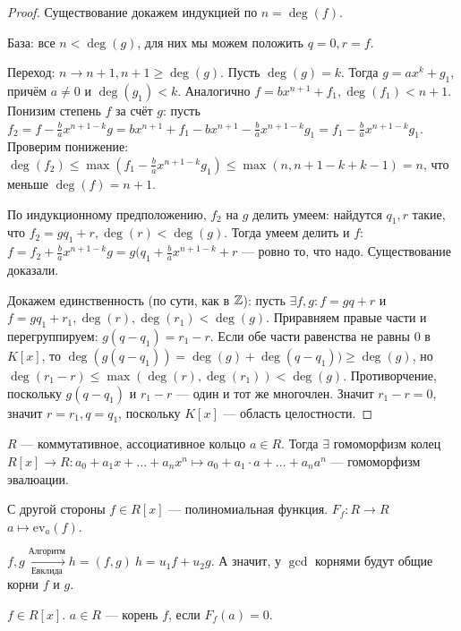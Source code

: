 \begin{proof}
    Существование докажем индукцией по $n = \deg(f)$. 

    База: все $n < \deg(g)$, для них мы можем положить $q = 0, r = f$.

    Переход: $n \to n + 1, n + 1 \ge \deg(g)$. Пусть $\deg(g) = k$. Тогда $g = ax^k + g_1$, причём $a \neq 0$ и $\deg(g_1) < k$. Аналогично $f = bx^{n + 1} + f_1, \deg(f_1) < n + 1$. Понизим степень $f$ за счёт $g$: пусть $f_2 = f - \frac{b}a x^{n+1-k}g = bx^{n+1} + f_1 - bx^{n+1} - \frac{b}a x^{n + 1 - k}g_1 = f_1 - \frac{b}a x^{n + 1 - k}g_1$. Проверим понижение: $\deg(f_2) \le \max(f_1 - \frac{b}a x^{n + 1 - k}g_1) \le \max(n, n + 1 - k + k - 1) = n$, что меньше $\deg(f) = n + 1$. 

    По индукционному предположению, $f_2$ на $g$ делить умеем: найдутся $q_1, r$ такие, что $f_2 = gq_1 + r, \deg(r) < \deg(g)$. Тогда умеем делить и $f$: $f = f_2 + \frac{b}a x^{n + 1 - k}g = g(q_1 + \frac{b}a x^{n + 1 - k} + r$ --- ровно то, что надо. Существование доказали.

    Докажем единственность (по сути, как в $\mathbb{Z}$): пусть $\exists f, g: f = gq+r$ и $f = gq_1 + r_1, \deg(r), \deg(r_1) < \deg(g)$. Приравняем правые части и перегруппируем: $g(q - q_1) = r_1 - r$. Если обе части равенства не равны 0 в $K[x]$, то $\deg(g(q - q_1)) = \deg(g) + \deg(q - q_1)) \ge \deg(g)$, но $\deg(r_1 - r) \le \max(\deg(r), \deg(r_1)) < \deg(g)$. Противорчение, поскольку $g(q - q_1)$ и $r_1 - r$ --- один и тот же многочлен. Значит $r_1 - r = 0$, значит $r = r_1, q = q_1$, поскольку $K[x]$ --- область целостности.
\end{proof}
\begin{theorem}
    $R$ --- коммутативное, ассоциативное кольцо  $a \in R$. Тогда $\exists$ гомоморфизм колец  $R[x] \to R: a_0 + a_1 x + \ldots + a_n x^n \mapsto a_0 + a_1 \cdot a + \ldots + a_n a^n$ --- гомоморфизм эвалюации. 

    С другой стороны $f \in R[x]$ --- полиномиальная функция.  $F_f: R \to R$  $a \mapsto \text{ev}_a(f)$.
\end{theorem}
\begin{consequence}
    $f, g \xrightarrow[\text{Евклида}]{\text{Алгоритм}} h = (f, g)\ h= u_1f + u_2g$. А значит, у $\gcd$ корнями будут общие корни  $f$ и  $g$.
\end{consequence}
\begin{definition}
    $f \in R[x]$.  $a\in R$ --- корень  $f$, если  $F_f(a) = 0$.
\end{definition}
